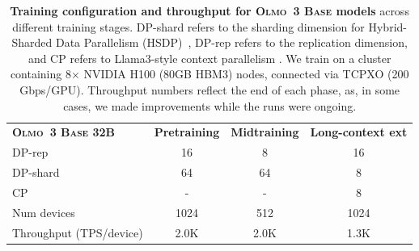 \documentclass[table]{ai2style/ai2}
\newcommand{\newOlmo}{Olmo\xspace}
\newcommand{\olmothreebase}{\textsc{\newOlmo~3 Base}\xspace}
\begin{document}
{{\begin{table}[!h]
\begin{small}
\begin{tabular}{lccc}
        \midrule

        \rowcolor{ai2lightpink}  \textbf{\olmothreebase 32B} & \textbf{Pretraining} & \textbf{Midtraining} & \textbf{Long-context ext} \\[2pt]
        {DP-rep} & 16 & 8 & 16 \\
        \rowcolor{midgrey} {DP-shard} & 64 & 64 & 8 \\
        {CP} & - & - & 8 \\
        \rowcolor{midgrey} {Num devices} & 1024 & 512 & 1024 \\
        {Throughput (TPS/device)} & 2.0K & 2.0K & 1.3K \\

        \bottomrule
    \end{tabular}
    \end{small}
    \caption{\textbf{Training configuration and throughput for \olmothreebase models} across different training stages. DP-shard refers to the sharding dimension for Hybrid-Sharded Data Parallelism (HSDP)~\citep{zhao2023pytorchfsdpexperiencesscaling}, DP-rep refers to the replication dimension, and CP refers to Llama3-style context parallelism \citep{scalingllama3}. We train on a cluster containing 8$\times$ NVIDIA H100 (80GB HBM3) nodes, connected via TCPXO (200 Gbps/GPU). Throughput numbers reflect the end of each phase, as, in some cases, we made improvements while the runs were ongoing.}
    \label{tab:training-config}
\end{table}

}}
\end{document}
